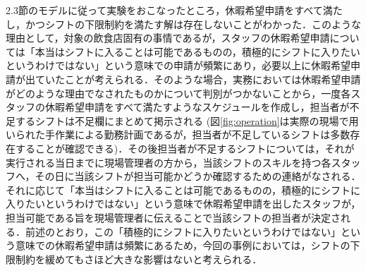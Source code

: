 \documentclass[twocolumn]{jsarticle}
\begin{document}
2.3節のモデルに従って実験をおこなったところ，休暇希望申請をすべて満たし，かつシフトの下限制約を満たす解は存在しないことがわかった．このような理由として，対象の飲食店固有の事情であるが，スタッフの休暇希望申請については「本当はシフトに入ることは可能であるものの，積極的にシフトに入りたいというわけではない」という意味での申請が頻繁にあり，必要以上に休暇希望申請が出ていたことが考えられる．そのような場合，実務においては休暇希望申請がどのような理由でなされたものかについて判別がつかないことから，一度各スタッフの休暇希望申請をすべて満たすようなスケジュールを作成し，担当者が不足するシフトは不足欄にまとめて掲示される (図\ref{fig:operation}は実際の現場で用いられた手作業による勤務計画であるが，担当者が不足しているシフトは多数存在することが確認できる)．その後担当者が不足するシフトについては，それが実行される当日までに現場管理者の方から，当該シフトのスキルを持つ各スタッフへ，その日に当該シフトが担当可能かどうか確認するための連絡がなされる．それに応じて「本当はシフトに入ることは可能であるものの，積極的にシフトに入りたいというわけではない」という意味で休暇希望申請を出したスタッフが，担当可能である旨を現場管理者に伝えることで当該シフトの担当者が決定される．前述のとおり，この「積極的にシフトに入りたいというわけではない」という意味での休暇希望申請は頻繁にあるため，今回の事例においては，シフトの下限制約を緩めてもさほど大きな影響はないと考えられる．
\end{document}
